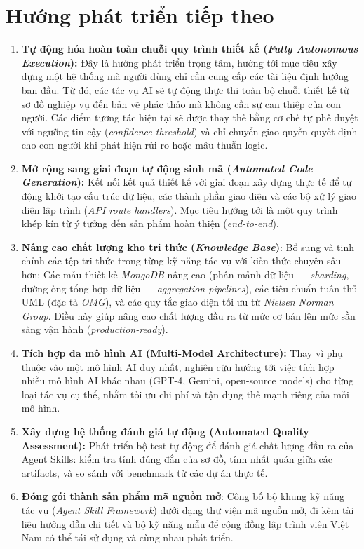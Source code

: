 \documentclass[13pt,a4paper,oneside]{extreport}
\numberwithin{equation}{chapter}
\numberwithin{figure}{chapter}
\numberwithin{table}{chapter}
\begin{document}
\section*{Hướng phát triển tiếp theo}

\begin{enumerate}
    \item \textbf{Tự động hóa hoàn toàn chuỗi quy trình thiết kế (\textit{Fully Autonomous Execution}):} Đây là hướng phát triển trọng tâm, hướng tới mục tiêu xây dựng một hệ thống mà người dùng chỉ cần cung cấp các tài liệu định hướng ban đầu. Từ đó, các tác vụ AI sẽ tự động thực thi toàn bộ chuỗi thiết kế từ sơ đồ nghiệp vụ đến bản vẽ phác thảo mà không cần sự can thiệp của con người. Các điểm tương tác hiện tại sẽ được thay thế bằng cơ chế tự phê duyệt với ngưỡng tin cậy (\textit{confidence threshold}) và chỉ chuyển giao quyền quyết định cho con người khi phát hiện rủi ro hoặc mâu thuẫn logic.

    \item \textbf{Mở rộng sang giai đoạn tự động sinh mã (\textit{Automated Code Generation}):} Kết nối kết quả thiết kế với giai đoạn xây dựng thực tế để tự động khởi tạo cấu trúc dữ liệu, các thành phần giao diện và các bộ xử lý giao diện lập trình (\textit{API route handlers}). Mục tiêu hướng tới là một quy trình khép kín từ ý tưởng đến sản phẩm hoàn thiện (\textit{end-to-end}).

    \item \textbf{Nâng cao chất lượng kho tri thức (\textit{Knowledge Base})}: Bổ sung và tinh chỉnh các tệp tri thức trong từng kỹ năng tác vụ với kiến thức chuyên sâu hơn: Các mẫu thiết kế \textit{MongoDB} nâng cao (phân mảnh dữ liệu — \textit{sharding}, đường ống tổng hợp dữ liệu — \textit{aggregation pipelines}), các tiêu chuẩn tuân thủ UML (đặc tả \textit{OMG}), và các quy tắc giao diện tối ưu từ \textit{Nielsen Norman Group}. Điều này giúp nâng cao chất lượng đầu ra từ mức cơ bản lên mức sẵn sàng vận hành (\textit{production-ready}).
    \item \textbf{Tích hợp đa mô hình AI (Multi-Model Architecture):} Thay vì phụ thuộc vào một mô hình AI duy nhất, nghiên cứu hướng tới việc tích hợp nhiều mô hình AI khác nhau (GPT-4, Gemini, open-source models) cho từng loại tác vụ cụ thể, nhằm tối ưu chi phí và tận dụng thế mạnh riêng của mỗi mô hình.

    \item \textbf{Xây dựng hệ thống đánh giá tự động (Automated Quality Assessment):} Phát triển bộ test tự động để đánh giá chất lượng đầu ra của Agent Skills: kiểm tra tính đúng đắn của sơ đồ, tính nhất quán giữa các artifacts, và so sánh với benchmark từ các dự án thực tế.

    \item \textbf{Đóng gói thành sản phẩm mã nguồn mở}: Công bố bộ khung kỹ năng tác vụ (\textit{Agent Skill Framework}) dưới dạng thư viện mã nguồn mở, đi kèm tài liệu hướng dẫn chi tiết và bộ kỹ năng mẫu để cộng đồng lập trình viên Việt Nam có thể tái sử dụng và cùng nhau phát triển.
\end{enumerate}
\end{document}
